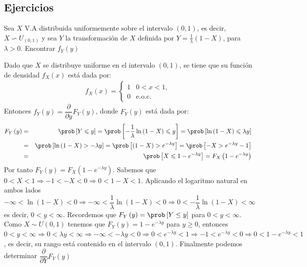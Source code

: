 \subsection{Ejercicios}
\begin{Ejem}
Sea $X$ V.A distribuida uniformemente sobre el intervalo $ \left(0,1 \right)$, es decir,  $X \backsim U_{\left(0,1\right)}$ y sea $Y$ la transformaci\'on de $X$ definida por  $Y=\frac{1}{\lambda}\left( 1-X \right)$, 
para $\lambda > 0$. Encontrar $f_{Y}\left(y\right)$

Dado que $X$ se distribuye uniforme en el intervalo $\left(0,1 \right)$, se tiene que su funci\'on de densidad $ f_{X}\left(x\right)$ est\'a dada por: 
\begin{eqnarray*}
f_{X}\left(x\right) = \left\{
\begin{array}{cc}
1 & 0< x <1, \\
0 & \textrm {e.o.c.} 
\end{array}
\right.
\end{eqnarray*} 
 Entonces $f_{Y}\left( y \right)=\dfrac{\partial}{\partial y} F_{Y}\left(y \right)$, donde $F_{Y}\left(y \right)$ est\'a dada por:
\begin{eqnarray*}
F_{Y}\left( y \right) &=& \prob \left[ Y \leqslant y \right]  = \prob \left[-\dfrac{1}{\lambda}\ln \left( 1-X\right) \leqslant y \right] =\prob \left[ \ln \left( 1-X \right) \leqslant \lambda y \right]\\
&=&\prob \left[ \ln \left( 1-X \right) > - \lambda y \right] = \prob \left[ \left( 1-X \right) > e^ {- \lambda y}\right] = \prob \left[-X > e^ {-\lambda y} - 1 \right] \\
&=& \prob \left[X \leqslant 1- e^{- \lambda y}\right] = F_{X}\left(1-e^{-\lambda y}\right)
\end{eqnarray*}
Por tanto $F_{Y}\left(y \right)=F_{X}\left(1-e^{-\lambda y}\right)$. Sabemos que $0<X<1 \Rightarrow -1< -X < 0 \Rightarrow 0 < 1-X < 1$.  Aplicando el logaritmo natural en ambos lados $-\infty < \ln \left(1-X\right) < 0\Rightarrow  -\infty < \dfrac{1}{\lambda} \ln \left(1-X\right) < 0\Rightarrow0 < - \dfrac{1}{\lambda}  \ln \left(1-X\right) <\infty $ es decir, $0<y<\infty$. Recordemos que $F_{Y} \left(y \right)= \prob \left[Y \leq y \right]$ para $0 < y < \infty$. Como $X \sim U \left(0,1 \right)$ tenemos que 
$F_{Y}\left(y\right) =1-e^{-\lambda y}$ para $ y \geq 0$, entonces $0< y < \infty \Rightarrow0< \lambda y < \infty\Rightarrow- \infty < -\lambda y < 0\Rightarrow0<e ^{-\lambda y} < 1\Rightarrow-1<e^{-\lambda y} < 0\Rightarrow0<1 - e^{-\lambda y} < 1 $, es decir, su rango est\'a contenido en el intervalo  $ \left( 0,1 \right)$. Finalmente podemos determinar $\dfrac{\partial}{\partial Y} F_{Y} \left( y \right)$

\end{Ejem}

